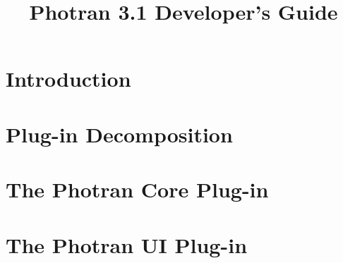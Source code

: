 \documentclass[10pt,letterpaper]{report}
\begin{document}
\title{Photran 3.1 Developer's Guide}
\author{

}
\date{}

\maketitle

\tableofcontents


\chapter{Introduction}


\chapter{Plug-in Decomposition}


%

\chapter{The Photran Core Plug-in}


\chapter{The Photran UI Plug-in}


%

%

%

%
\end{document}
